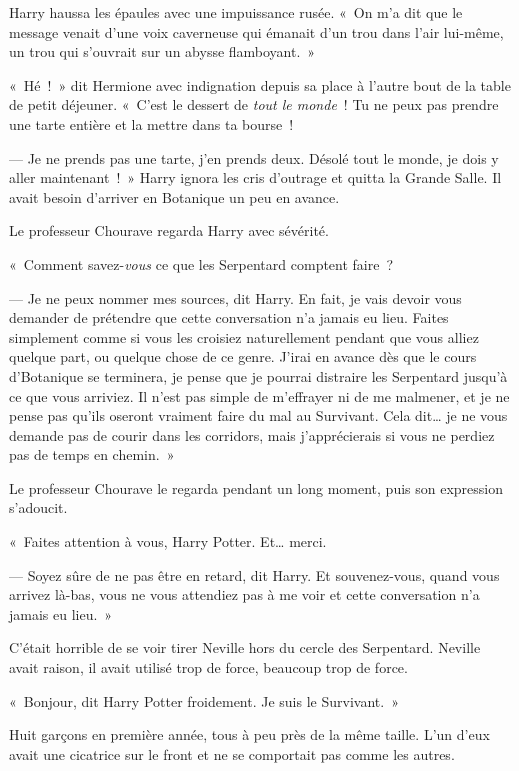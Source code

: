 Harry haussa les épaules avec une impuissance rusée. «~On m'a dit que le message venait d'une voix caverneuse qui émanait d'un trou dans l'air lui-même, un trou qui s'ouvrait sur un abysse flamboyant.~»

\later

«~Hé~!~» dit Hermione avec indignation depuis sa place à l'autre bout de la table de petit déjeuner. «~C'est le dessert de \emph{tout le monde}~! Tu ne peux pas prendre une tarte entière et la mettre dans ta bourse~!

--- Je ne prends pas une tarte, j'en prends deux. Désolé tout le monde, je dois y aller maintenant~!~» Harry ignora les cris d'outrage et quitta la Grande Salle. Il avait besoin d'arriver en Botanique un peu en avance.

\later

Le professeur Chourave regarda Harry avec sévérité.

«~Comment savez-\emph{vous} ce que les Serpentard comptent faire~?

--- Je ne peux nommer mes sources, dit Harry. En fait, je vais devoir vous demander de prétendre que cette conversation n'a jamais eu lieu. Faites simplement comme si vous les croisiez naturellement pendant que vous alliez quelque part, ou quelque chose de ce genre. J'irai en avance dès que le cours d'Botanique se terminera, je pense que je pourrai distraire les Serpentard jusqu'à ce que vous arriviez. Il n'est pas simple de m'effrayer ni de me malmener, et je ne pense pas qu'ils oseront vraiment faire du mal au Survivant. Cela dit… je ne vous demande pas de courir dans les corridors, mais j'apprécierais si vous ne perdiez pas de temps en chemin.~»

Le professeur Chourave le regarda pendant un long moment, puis son expression s'adoucit.

«~Faites attention à vous, Harry Potter. Et… merci.

--- Soyez sûre de ne pas être en retard, dit Harry. Et souvenez-vous, quand vous arrivez là-bas, vous ne vous attendiez pas à me voir et cette conversation n'a jamais eu lieu.~»

\later

C'était horrible de se voir tirer Neville hors du cercle des Serpentard. Neville avait raison, il avait utilisé trop de force, beaucoup trop de force.

«~Bonjour, dit Harry Potter froidement. Je suis le Survivant.~»

Huit garçons en première année, tous à peu près de la même taille. L'un d'eux avait une cicatrice sur le front et ne se comportait pas comme les autres.

